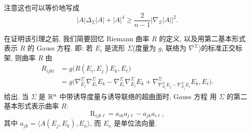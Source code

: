 注意这也可以等价地写成
\begin{equation}
|A|\Delta_{\Sigma}|A|+|A|^{4}
 \geq\frac{2}{n-1}\bigl|\nabla_{\Sigma}|A|\bigr|^{2}.
\label{eq:2.3}
\end{equation}

在证明该引理之前, 我们简要回忆 Riemann 曲率 $R$ 的定义, 以及用第二基本形式
表示 $R$ 的 Gauss 方程. 即: 若 $E_i$ 是流形 $\Sigma$(度量为 $g$, 联络为
$\nabla^{\Sigma}$)的标准正交标架, 则曲率 $R$ 由
\begin{equation}
\begin{aligned}
R_{ijkl}&=g\bigl(R(E_i,E_j)E_k,E_\ell\bigr)\\
&=g\bigl(\nabla^{\Sigma}_{E_j}\nabla^{\Sigma}_{E_i}E_k
 -\nabla^{\Sigma}_{E_i}\nabla^{\Sigma}_{E_j}E_k
 +\nabla^{\Sigma}_{\nabla^{\Sigma}_{E_i}E_j-\nabla^{\Sigma}_{E_j}E_i}E_k,
 E_\ell\bigr).
\end{aligned}
\label{eq:2.4}
\end{equation}
给出. 当 $\Sigma$ 是 $\mathbb{R}^n$ 中带诱导度量与诱导联络的超曲面时, Gauss 方程
用 $\Sigma$ 的第二基本形式表示曲率 $R$:
\begin{equation}
\mathrm{R}_{ijk\ell}=a_{ik}a_{j\ell}-a_{jk}a_{i\ell},
\label{eq:2.5}
\end{equation}
其中 $a_{jk}=\langle A(E_j,E_k),E_n\rangle$, 而 $E_n$ 是单位法向量.

